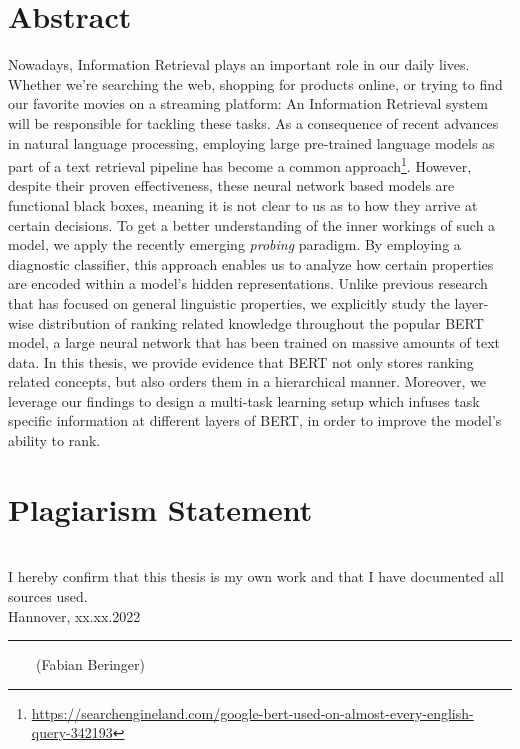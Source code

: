 \documentclass[headsepline]{scrreprt}
\newcommand{\handindate}{xx.xx.2022}
\newcommand{\ti}[1]{\textit{#1}}
\begin{document}


\chapter*{Abstract}
Nowadays, Information Retrieval plays an important role in our daily lives. Whether we're searching the web, shopping for products online, or trying to find our favorite movies on a streaming platform: An Information Retrieval system will be responsible for tackling these tasks. As a consequence of recent advances in natural language processing, employing large pre-trained language models as part of a text retrieval pipeline has become a common approach\footnote{\url{https://searchengineland.com/google-bert-used-on-almost-every-english-query-342193}}. However, despite their proven effectiveness, these neural network based models are functional black boxes, meaning it is not clear to us as to how they arrive at certain decisions. To get a better understanding of the inner workings of such a model, we apply the recently emerging \ti{probing} paradigm. By employing a diagnostic classifier, this approach enables us to analyze how certain properties are encoded within a model's hidden representations. Unlike previous research that has focused on general linguistic properties, we explicitly study the layer-wise distribution of ranking related knowledge throughout the popular BERT model, a large neural network that has been trained on massive amounts of text data. In this thesis, we provide evidence that BERT not only stores ranking related concepts, but also orders them in a hierarchical manner. Moreover, we leverage our findings to design a multi-task learning setup which infuses task specific information at different layers of BERT, in order to improve the model's ability to rank.

\tableofcontents










\chapter*{Plagiarism Statement}
\vfill
\mbox{} \\
{\large I hereby confirm that this thesis is my own work and that I have documented all sources used.}
\newline
\mbox{} \\
Hannover, \handindate \\
\vspace{4cm}
\hrule
\vspace{0.5cm}
$\qquad$(Fabian Beringer)

\listoffigures
{}
\listoftables
{}
\clearpage
{}
{}

\end{document}

